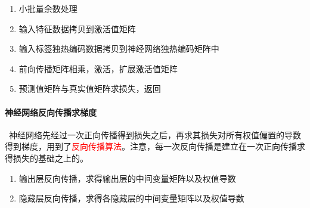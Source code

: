 \begin{enumerate}
  \item 小批量余数处理
  \item 输入特征数据拷贝到激活值矩阵
  \item 输入标签独热编码数据拷贝到神经网络独热编码矩阵中
  \item 前向传播矩阵相乘，激活，扩展激活值矩阵
  \item 预测值矩阵与真实值矩阵求损失，返回
\end{enumerate}

\paragraph{神经网络反向传播求梯度} ~神经网络先经过一次正向传播得到损失之后，再求其损失对所有权值偏置的导数得到梯度，用到了\textcolor{red}{反向传播算法}。注意，每一次反向传播是建立在一次正向传播求得损失的基础之上的。

\begin{enumerate}
  \item 输出层反向传播，求得输出层的中间变量矩阵以及权值导数
  \item 隐藏层反向传播，求得各隐藏层的中间变量矩阵以及权值导数
\end{enumerate}